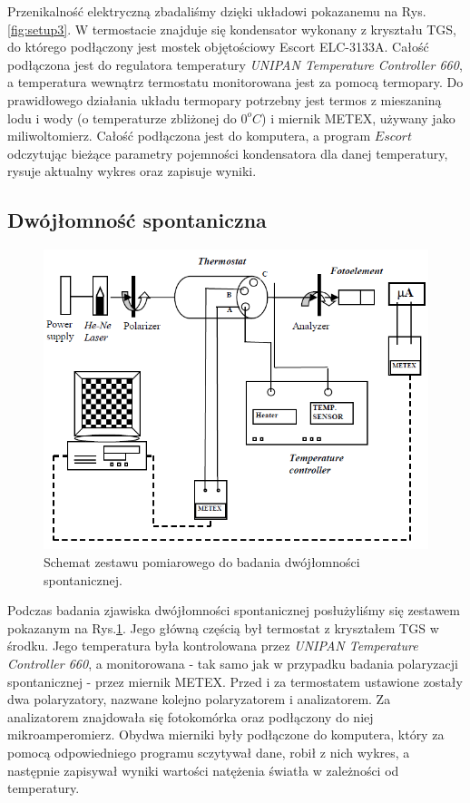 \documentclass{article}
\begin{document}
Przenikalność elektryczną zbadaliśmy dzięki układowi pokazanemu na Rys.\ref{fig:setup3}. W termostacie znajduje się kondensator wykonany z kryształu TGS, do którego podłączony jest mostek objętościowy Escort ELC-3133A. Całość podłączona jest do regulatora temperatury \textit{UNIPAN Temperature Controller 660}, a temperatura wewnątrz termostatu monitorowana jest za pomocą termopary. Do prawidłowego działania układu termopary potrzebny jest termos z mieszaniną lodu i wody (o temperaturze zbliżonej do $0^{o}C$) i miernik METEX, używany jako miliwoltomierz. Całość podłączona jest do komputera, a program $Escort$ odczytując bieżące parametry pojemności kondensatora dla danej temperatury, rysuje aktualny wykres oraz zapisuje wyniki.

\subsection{Dwójłomność spontaniczna}

\begin{figure}[!h]
	\centering
	\includegraphics[width=0.7\linewidth]{setup2.png}
	\caption{Schemat zestawu pomiarowego do badania dwójłomności spontanicznej.}
	\label{fig:setup2}
\end{figure}

Podczas badania zjawiska dwójłomności spontanicznej posłużyliśmy się zestawem pokazanym na Rys.\ref{fig:setup2}. Jego główną częścią był termostat z kryształem TGS w środku. Jego temperatura była kontrolowana przez \textit{UNIPAN Temperature Controller 660}, a monitorowana - tak samo jak w przypadku badania polaryzacji spontanicznej - przez miernik METEX. Przed i za termostatem ustawione zostały dwa polaryzatory, nazwane kolejno polaryzatorem i analizatorem. Za analizatorem znajdowała się fotokomórka oraz podłączony do niej mikroamperomierz. Obydwa mierniki były podłączone do komputera, który za pomocą odpowiedniego programu sczytywał dane, robił z nich wykres, a następnie zapisywał wyniki wartości natężenia światła w zależności od temperatury.
\end{document}
